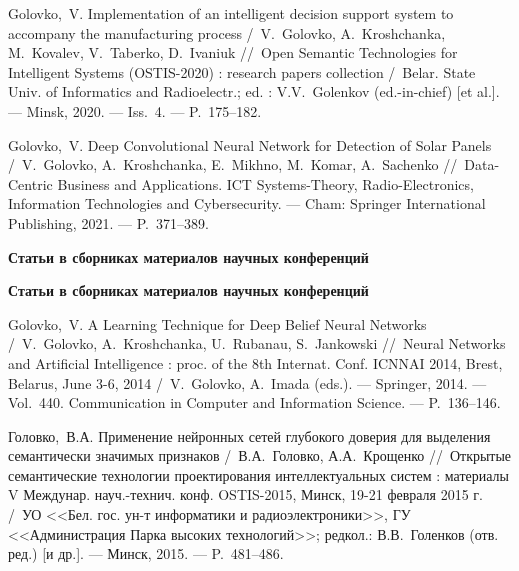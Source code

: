 Golovko,~V. Implementation of an intelligent decision support system to accompany the manufacturing process /~V.~Golovko, A.~Kroshchanka, M.~Kovalev, V.~Taberko, D.~Ivaniuk
\newblock //~Open Semantic Technologies for Intelligent Systems (OSTIS-2020) : research papers collection
\newblock /~Belar. State Univ. of Informatics and Radioelectr.; ed. : V.V.~Golenkov (ed.-in-chief) [et al.]. ---
\newblock Minsk, 2020. ---
\newblock Iss.~4. ---
\newblock P.~175--182.

Golovko,~V. Deep Convolutional Neural Network for Detection of Solar Panels /~V.~Golovko, A.~Kroshchanka, E.~Mikhno, M.~Komar, A.~Sachenko
\newblock //~Data-Centric Business and Applications. ICT Systems-Theory, Radio-Electronics, Information Technologies and Cybersecurity. ---
\newblock Cham: Springer International Publishing, 2021. ---
\newblock P.~371--389.

\ifx\isabstract\undefined 
\begin{center}
\vspace{3mm}
{\bf Статьи в сборниках материалов научных конференций}
\vspace{3mm}
\end{center}
\else
\vspace{2mm}
{\bf Статьи в сборниках материалов научных конференций}
\vspace{2mm}
\fi

Golovko,~V. A Learning Technique for Deep Belief Neural Networks /~V.~Golovko, A.~Kroshchanka, U.~Rubanau, S.~Jankowski
\newblock //~Neural Networks and Artificial Intelligence : proc. of the 8th Internat. Conf. ICNNAI 2014, Brest, Belarus, June 3-6, 2014
\newblock /~V.~Golovko, A.~Imada (eds.). ---
\newblock Springer, 2014. ---
\newblock Vol.~440. Communication in Computer and Information Science. ---
\newblock P.~136--146.

Головко,~В.А. Применение нейронных сетей глубокого доверия для выделения семантически значимых признаков /~В.А.~Головко, А.А.~Крощенко
\newblock //~Открытые семантические технологии проектирования интеллектуальных систем : материалы V Междунар. науч.-технич. конф. OSTIS-2015, Минск, 19-21 февраля 2015 г.
\newblock /~УО <<Бел. гос. ун-т информатики и радиоэлектроники>>, ГУ <<Администрация Парка высоких технологий>>; редкол.: В.В.~Голенков (отв. ред.) [и др.]. ---
\newblock Минск, 2015. ---
\newblock P.~481--486.

